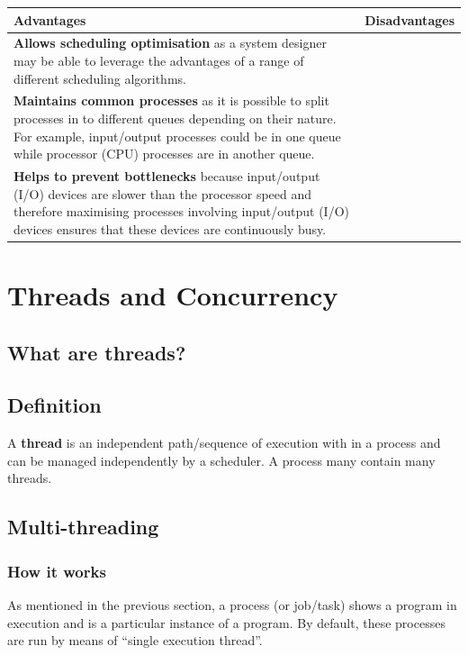 \documentclass[a4paper]{systems-software}
\begin{document}
\begin{longtabu} to \textwidth {|X[1,l]|X[1,l]|}
    \hline
    \textbf{Advantages} & \textbf{Disadvantages}
    \\ \hline
    \textbf{Allows scheduling optimisation} as a system designer may be able to leverage the advantages of a range of different scheduling algorithms.
    &
    \\ \hline
  	\textbf{Maintains common processes} as it is possible to split processes in to different queues depending on their nature. For example, input/output processes could be in one queue while processor (CPU) processes are in another queue.
    &
    \\ \hline
    \textbf{Helps to prevent bottlenecks} because input/output (I/O) devices are slower than the processor speed and therefore maximising processes involving input/output (I/O) devices ensures that these devices are continuously busy.
    &
	\\ \hline
\end{longtabu}


\chapter{Threads and Concurrency}
\label{chap:3}

\section{What are threads?}

\section*{Definition}

A \textbf{thread} is an independent path/sequence of execution with in a process and can be managed independently by a scheduler. A process many contain many threads.


\section*{Multi-threading}

\subsection*{How it works}

As mentioned in the previous section, a process (or job/task) shows a program in execution and is a particular instance of a program. By default, these processes are run by means of “single execution thread”.
\end{document}
